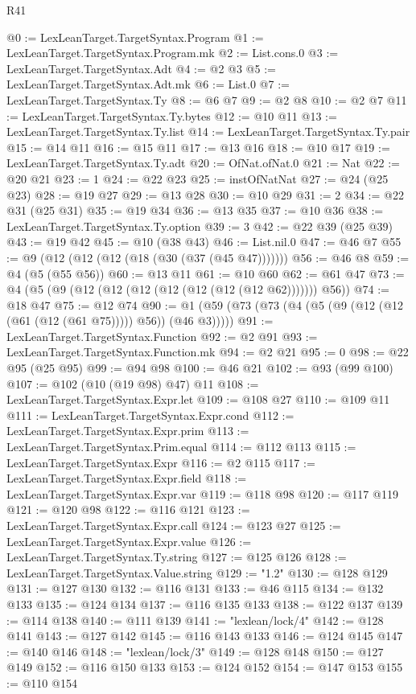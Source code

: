 \begin{lexlean}{R41}
\begin{coremodule}
@0 := LexLeanTarget.TargetSyntax.Program
@1 := LexLeanTarget.TargetSyntax.Program.mk
@2 := List.cons.{0}
@3 := LexLeanTarget.TargetSyntax.Adt
@4 := @2 @3
@5 := LexLeanTarget.TargetSyntax.Adt.mk
@6 := List.{0}
@7 := LexLeanTarget.TargetSyntax.Ty
@8 := @6 @7
@9 := @2 @8
@10 := @2 @7
@11 := LexLeanTarget.TargetSyntax.Ty.bytes
@12 := @10 @11
@13 := LexLeanTarget.TargetSyntax.Ty.list
@14 := LexLeanTarget.TargetSyntax.Ty.pair
@15 := @14 @11
@16 := @15 @11
@17 := @13 @16
@18 := @10 @17
@19 := LexLeanTarget.TargetSyntax.Ty.adt
@20 := OfNat.ofNat.{0}
@21 := Nat
@22 := @20 @21
@23 := 1
@24 := @22 @23
@25 := instOfNatNat
@27 := @24 (@25 @23)
@28 := @19 @27
@29 := @13 @28
@30 := @10 @29
@31 := 2
@34 := @22 @31 (@25 @31)
@35 := @19 @34
@36 := @13 @35
@37 := @10 @36
@38 := LexLeanTarget.TargetSyntax.Ty.option
@39 := 3
@42 := @22 @39 (@25 @39)
@43 := @19 @42
@45 := @10 (@38 @43)
@46 := List.nil.{0}
@47 := @46 @7
@55 := @9 (@12 (@12 (@12 (@18 (@30 (@37 (@45 @47)))))))
@56 := @46 @8
@59 := @4 (@5 (@55 @56))
@60 := @13 @11
@61 := @10 @60
@62 := @61 @47
@73 := @4 (@5 (@9 (@12 (@12 (@12 (@12 (@12 (@12 (@12 @62))))))) @56))
@74 := @18 @47
@75 := @12 @74
@90 := @1 (@59 (@73 (@73 (@4 (@5 (@9 (@12 (@12 (@61 (@12 (@61 @75))))) @56)) (@46 @3)))))
@91 := LexLeanTarget.TargetSyntax.Function
@92 := @2 @91
@93 := LexLeanTarget.TargetSyntax.Function.mk
@94 := @2 @21
@95 := 0
@98 := @22 @95 (@25 @95)
@99 := @94 @98
@100 := @46 @21
@102 := @93 (@99 @100)
@107 := @102 (@10 (@19 @98) @47) @11
@108 := LexLeanTarget.TargetSyntax.Expr.let
@109 := @108 @27
@110 := @109 @11
@111 := LexLeanTarget.TargetSyntax.Expr.cond
@112 := LexLeanTarget.TargetSyntax.Expr.prim
@113 := LexLeanTarget.TargetSyntax.Prim.equal
@114 := @112 @113
@115 := LexLeanTarget.TargetSyntax.Expr
@116 := @2 @115
@117 := LexLeanTarget.TargetSyntax.Expr.field
@118 := LexLeanTarget.TargetSyntax.Expr.var
@119 := @118 @98
@120 := @117 @119
@121 := @120 @98
@122 := @116 @121
@123 := LexLeanTarget.TargetSyntax.Expr.call
@124 := @123 @27
@125 := LexLeanTarget.TargetSyntax.Expr.value
@126 := LexLeanTarget.TargetSyntax.Ty.string
@127 := @125 @126
@128 := LexLeanTarget.TargetSyntax.Value.string
@129 := "1.2"
@130 := @128 @129
@131 := @127 @130
@132 := @116 @131
@133 := @46 @115
@134 := @132 @133
@135 := @124 @134
@137 := @116 @135 @133
@138 := @122 @137
@139 := @114 @138
@140 := @111 @139
@141 := "lexlean/lock/4"
@142 := @128 @141
@143 := @127 @142
@145 := @116 @143 @133
@146 := @124 @145
@147 := @140 @146
@148 := "lexlean/lock/3"
@149 := @128 @148
@150 := @127 @149
@152 := @116 @150 @133
@153 := @124 @152
@154 := @147 @153
@155 := @110 @154

\end{coremodule}
\end{lexlean}
